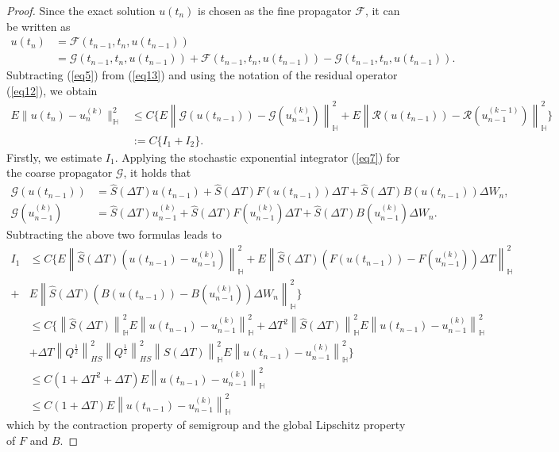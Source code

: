 \documentclass[preprint,12pt]{elsarticle}
\newtheorem{proof}{Proof}
\begin{document}
	\begin{proof}
		Since the exact solution  $u(t_{n})$  is chosen as the fine propagator $\mathcal{F}$, it can be written as
		\begin{align}\label{eq13}
			u(t_{n})&=\mathcal{F}(t_{n-1},t_{n},u(t_{n-1}))\nonumber\\
			&=\mathcal{G} (t_{n-1},t_{n},u(t_{n-1}))+\mathcal{F} (t_{n-1},t_{n},u(t_{n-1}))-\mathcal{G} (t_{n-1},t_{n},u(t_{n-1})).
		\end{align}
		Subtracting (\ref{eq5}) from (\ref{eq13}) and  using the notation of the residual operator (\ref{eq12}), we obtain
		\begin{align*}
			E\|u(t_{n})-u_{n}^{(k)}\|_{\mathbb{H}}^2&\leq C \{E\left\|\mathcal{G} (u(t_{n-1}))-\mathcal{G} (u_{n-1}^{(k)})\right\|_{\mathbb{H}}^2+E\left\| \mathcal{R}(u(t_{n-1}))
			- \mathcal{R} (u_{n-1}^{(k-1)})\right\|_{\mathbb{H}}^2\}\\
			&:=C\{I_{1}+I_{2}\}.
		\end{align*}
		Firstly, we estimate $I_{1}$. Applying the stochastic exponential integrator (\ref{eq7}) for the coarse propagator $\mathcal{G}$, it holds that
		\begin {align}
		\mathcal{G} (u(t_{n-1}))&=\widehat S(\Delta T)u(t_{n-1})+\widehat S(\Delta T)F(u(t_{n-1}))\Delta T+\widehat S(\Delta T) B(u(t_{n-1}))\Delta W_{n},\label{eq14}\\
		\mathcal{G} (u_{n-1}^{(k)})&=\widehat S(\Delta T)u_{n-1}^{(k)}+\widehat S(\Delta T)F(u_{n-1}^{(k)})\Delta T+\widehat S(\Delta T)B(u_{n-1}^{(k)})\Delta W_{n}.\label{eq15}
	\end{align}
	Subtracting the above two formulas  leads to
	\begin{align}\label{eq16}
		I_{1}&\leq C\{E\left\|\widehat S(\Delta T)(u(t_{n-1})-u_{n-1}^{(k)})\right\|_{\mathbb{H}}^2+E\left\|\widehat S(\Delta T)(F(u(t_{n-1}))-F(u_{n-1}^{(k)}))\Delta T\right\|_{\mathbb{H}}^2\nonumber\\
		+&E\left\|\widehat S(\Delta T)(B(u(t_{n-1}))-B(u_{n-1}^{(k)}))\Delta W_{n}\right\|_{\mathbb{H}}^2\} \nonumber\\
		&\leq  C\{\left\|\widehat S(\Delta T)\right\|_{\mathbb{H}}^2E\left\|u(t_{n-1})-u_{n-1}^{(k)}\right\|_{\mathbb{H}}^2+\Delta T^2\left\|\widehat S(\Delta T)\right\|_{\mathbb{H}}^2E\left\|u(t_{n-1})-u_{n-1}^{(k)}\right\|_{\mathbb{H}}^2\nonumber \\
		&+\Delta T\left\|Q^{\frac{1}{2}}\right\|_{HS}^2\left\|Q^{\frac{1}{2}}\right\|_{HS}^2\left\|\widehat S(\Delta T)\right\|_{\mathbb{H}}^2E\left\|u(t_{n-1})-u_{n-1}^{(k)}\right\|_{\mathbb{H}}^2\}\nonumber \\
		&\leq C(1+\Delta T^2+\Delta T)E\left\|u(t_{n-1})-u_{n-1}^{(k)}\right\|_{\mathbb{H}}^2\nonumber \\
		&\leq C(1+\Delta T)E\left\|u(t_{n-1})-u_{n-1}^{(k)}\right\|_{\mathbb{H}}^2
	\end{align}
	which by the contraction property of semigroup and the global Lipschitz property of $F$ and $B$.
	

\end{proof}
\end{document}
